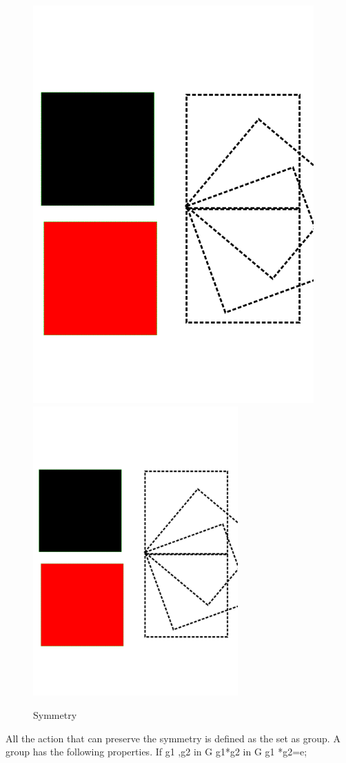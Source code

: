 \begin{figure}[!htbp]
  \begin{center}
    \leavevmode
    \ifpdf
      \includegraphics[height=6in]{Symmetry}
    \else
      \includegraphics[width=0.7\textwidth]{Symmetry}
    \fi
    \caption{Symmetry}
    \label{fig:symmetry}
\end{center}
\end{figure}
All the action that can preserve the symmetry is defined as the set as group.
A group has the following properties.
If g1 ,g2 in G
g1*g2 in G
g1 *g2=e;

